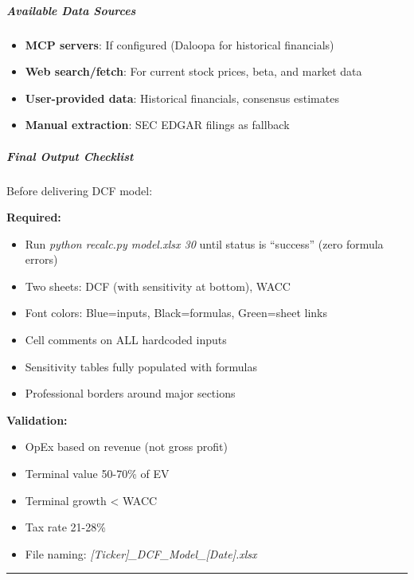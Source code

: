 \documentclass[11pt]{article}
\begin{document}
\subparagraph{Available Data Sources}\mbox{}\par

\begin{itemize}[leftmargin=*,itemsep=2pt,topsep=2pt]
\item {} \textbf{MCP servers}: If configured (Daloopa for historical financials)
\item {} \textbf{Web search/fetch}: For current stock prices, beta, and market data
\item {} \textbf{User-provided data}: Historical financials, consensus estimates
\item {} \textbf{Manual extraction}: SEC EDGAR filings as fallback
\end{itemize}

\subparagraph{Final Output Checklist}\mbox{}\par

Before delivering DCF model:


\textbf{Required:}

\begin{itemize}[leftmargin=*,itemsep=2pt,topsep=2pt]
\item {} Run \emph{python recalc.py model.xlsx 30} until status is ``success'' (zero formula errors)
\item {} Two sheets: DCF (with sensitivity at bottom), WACC
\item {} Font colors: Blue=inputs, Black=formulas, Green=sheet links
\item {} Cell comments on ALL hardcoded inputs
\item {} Sensitivity tables fully populated with formulas
\item {} Professional borders around major sections
\end{itemize}

\textbf{Validation:}

\begin{itemize}[leftmargin=*,itemsep=2pt,topsep=2pt]
\item {} OpEx based on revenue (not gross profit)
\item {} Terminal value 50-70\% of EV
\item {} Terminal growth < WACC
\item {} Tax rate 21-28\%
\item {} File naming: \emph{[Ticker]\_\allowbreak{}DCF\_\allowbreak{}Model\_\allowbreak{}[Date].xlsx}
\end{itemize}

\vspace{0.8em}\hrule\vspace{0.8em}
\end{document}
